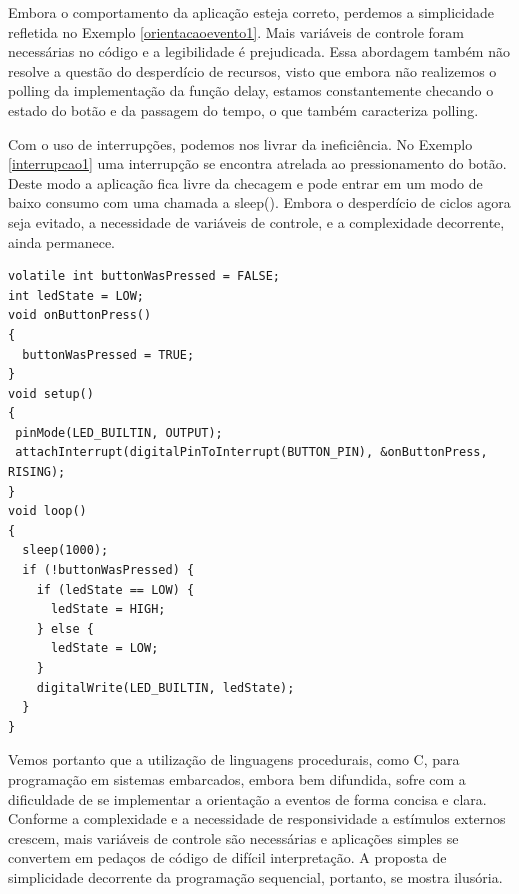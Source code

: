 \documentclass[11pt]{article}
\begin{document}
\par Embora o comportamento da aplicação esteja correto, perdemos a simplicidade refletida no Exemplo \ref{orientacaoevento1}. Mais variáveis de controle foram necessárias no código e a legibilidade é prejudicada. Essa abordagem também não resolve a questão do desperdício de recursos, visto que embora não realizemos o polling da implementação da função delay, estamos constantemente checando o estado do botão e da passagem do tempo, o que também caracteriza polling.
\par Com o uso de interrupções, podemos nos livrar da ineficiência. No Exemplo \ref{interrupcao1} uma interrupção se encontra atrelada ao pressionamento do botão. Deste modo a aplicação fica livre da checagem e pode entrar em um modo de baixo consumo com uma chamada a sleep(). Embora o desperdício de ciclos agora seja evitado, a necessidade de variáveis de controle, e a complexidade decorrente, ainda permanece.
\begin{lstlisting}[style=CStyle,label=interrupcao1,caption=Aplicação utilizando interrupção]
volatile int buttonWasPressed = FALSE;
int ledState = LOW;             
void onButtonPress()
{
  buttonWasPressed = TRUE;
}
void setup()
{
 pinMode(LED_BUILTIN, OUTPUT);
 attachInterrupt(digitalPinToInterrupt(BUTTON_PIN), &onButtonPress, RISING);
}
void loop()
{
  sleep(1000);
  if (!buttonWasPressed) {
    if (ledState == LOW) {
      ledState = HIGH;
    } else {
      ledState = LOW;
    }
    digitalWrite(LED_BUILTIN, ledState);
  }
}
\end{lstlisting}
\par\par Vemos portanto que a utilização de linguagens procedurais, como C, para programação em sistemas embarcados, embora bem difundida, sofre com a dificuldade de se implementar a orientação a eventos de forma concisa e clara. Conforme a complexidade e a necessidade de responsividade a estímulos externos crescem, mais variáveis de controle são necessárias e aplicações simples se convertem em pedaços de código de difícil interpretação. A proposta de simplicidade decorrente da programação sequencial, portanto, se mostra ilusória.
\end{document}
